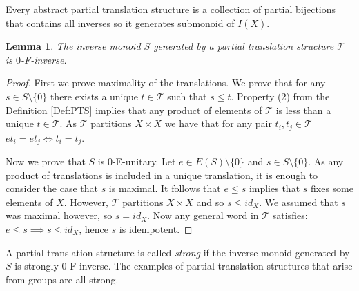 \documentclass[11pt,a4paper]{amsart}
\theoremstyle{plain}
\newtheorem{lemma}[theorem]{Lemma}%
\theoremstyle{definition}%
\theoremstyle{remark}%
\begin{document}
Every abstract partial translation structure is a collection of partial bijections that contains all inverses so it generates submonoid of $I(X)$.

\begin{lemma}
The inverse monoid $S$ generated by a partial translation structure $\mathcal{T}$ is $0$-F-inverse. 
\end{lemma}
\begin{proof}
First we prove maximality of the translations. We prove that for any $s\in S \setminus \lbrace 0 \rbrace$ there exists a unique $t \in \mathcal{T}$ such that $s \leq t$. Property (2) from the Definition \ref{Def:PTS} implies that any product of elements of $\mathcal{T}$ is less than a unique $t \in \mathcal{T}$. As $\mathcal{T}$ partitions $X \times X$ we have that for any pair $t_{i},t_{j}\in \mathcal{T}$ $et_{i}=et_{j} \Leftrightarrow t_{i}=t_{j}$. 

Now we prove that $S$ is $0$-E-unitary. Let $e\in E(S)\setminus \lbrace 0 \rbrace$ and $s\in S\setminus \lbrace 0 \rbrace$. As any product of translations is included in a unique translation, it is enough to consider the case that $s$ is maximal. It follows that $e \leq s$ implies that $s$ fixes some elements of $X$. However, $\mathcal{T}$ partitions $X \times X$ and so $s \leq id_{X}$. We assumed that $s$ was maximal however, so $s = id_{X}$. Now any general word in $\mathcal{T}$ satisfies: $e \leq s \implies s \leq id_{X}$, hence $s$ is idempotent.  
\end{proof}

A partial translation structure is called \textit{strong} if the inverse monoid generated by $S$ is strongly $0$-F-inverse. The examples of partial translation structures that arise from groups are all strong.
\end{document}
